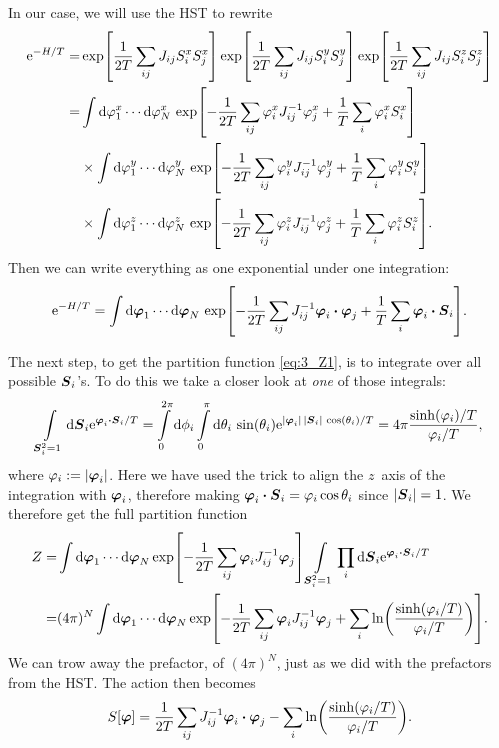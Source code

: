 \documentclass[11pt,letter, swedish, english
]{article}
\begin{document}
In our case, we will use the HST to rewrite
\begin{equation}
\begin{aligned}
\ee^{-H/T}=&\exp[\frac{1}{2T}\sum_{ij}J_{ij}S_i^xS_j^x]
\exp[\frac{1}{2T}\sum_{ij}J_{ij}S_i^yS_j^y]
\exp[\frac{1}{2T}\sum_{ij}J_{ij}S_i^zS_j^z]\\
=&\int\rd\varphi_1^x\cdots\rd\varphi_N^x
\,\exp[-\frac{1}{2T}\sum_{ij}\varphi_i^xJ_{ij}^{-1}\varphi_j^x
+\frac{1}{T}\sum_i\varphi_i^xS_i^x]\\
&\times\int\rd\varphi_1^y\cdots\rd\varphi_N^y
\,\exp[-\frac{1}{2T}\sum_{ij}\varphi_i^yJ_{ij}^{-1}\varphi_j^y
+\frac{1}{T}\sum_i\varphi_i^yS_i^y]\\
&\times\int\rd\varphi_1^z\cdots\rd\varphi_N^z
\,\exp[-\frac{1}{2T}\sum_{ij}\varphi_i^zJ_{ij}^{-1}\varphi_j^z
+\frac{1}{T}\sum_i\varphi_i^zS_i^z].
\end{aligned}
\end{equation}
Then we can write everything as one exponential under one integration:
\begin{equation}
\ee^{-H/T}=\int\rd\vb*\varphi_1\cdots\rd\vb*\varphi_N
\,\exp[-\frac{1}{2T}\sum_{ij}J_{ij}^{-1}\vb*\varphi_i\vdot\vb*\varphi_j
+\frac{1}{T}\sum_i\vb*\varphi_i\vdot\vb*S_i].
\end{equation}

The next step, to get the partition function \eqref{eq:3_Z1}, is to integrate over all
possible $\vb*S_i$'s. To do this we take a closer look at \emph{one}
of those integrals: 
\begin{equation}
\int_{\vb*S_i^2=1}\rd\vb*S_i\ee^{\vb*\varphi_i\vdot\vb*S_i/T}
=\int_0^{2\pi}\rd\phi_i\int_0^{\pi}\rd\theta_i\,\sin(\theta_i)
\ee^{|\vb*\varphi_i|\,|\vb*S_i|\,\cos(\theta_i)/T}
=4\pi\frac{\sinh(\varphi_i)/T}{\varphi_i/T},
\end{equation}
where $\varphi_i:=|\vb*\varphi_i|$.
Here we have used the trick to align the $z$~axis of the integration
with $\vb*\varphi_i$, therefore making
$\vb*\varphi_i\vdot\vb*S_i=\varphi_i\cos\theta_i$ since $|\vb*S_i|=1$.
We therefore get the full partition function
\begin{equation}
\begin{aligned}
Z=&\int\rd\vb*\varphi_1\cdots\rd\vb*\varphi_N
\exp[-\frac{1}{2T}\sum_{ij}\vb*\varphi_iJ_{ij}^{-1}\vb*\varphi_j]
\int_{\vb*S_i^2=1}\prod_i\rd\vb*S_i\ee^{\vb*\varphi_i\vdot\vb*S_i/T}\\
=&(4\pi)^N\int\rd\vb*\varphi_1\cdots\rd\vb*\varphi_N
\exp[-\frac{1}{2T}\sum_{ij}\vb*\varphi_iJ_{ij}^{-1}\vb*\varphi_j
+\sum_i\ln(\frac{\sinh(\varphi_i/T)}{\varphi_i/T})].
\end{aligned}
\end{equation}
We can trow away the prefactor, of $(4\pi)^N$, just as we did with the
prefactors from the HST. The action then becomes
\begin{equation}
S[\vb*\varphi]=\frac{1}{2T}\sum_{ij}J_{ij}^{-1}\vb*\varphi_i\vdot\vb*\varphi_j
-\sum_i\ln(\frac{\sinh(\varphi_i/T)}{\varphi_i/T}).
\end{equation}
\end{document}
